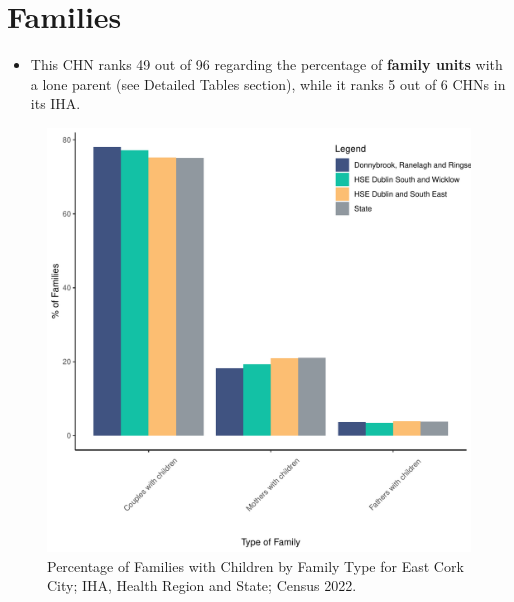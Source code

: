 \documentclass{article}
\begin{document}
\section{Families}\label{sect:Fam}
\begin{itemize}
\item This CHN ranks  49 out of 96 regarding the percentage of \textbf{family units} with a lone parent (see Detailed Tables section), while it ranks   5 out of 6 CHNs in its IHA.
\end{itemize}
\begin{figure}[H]
	\centering
	\includegraphics[width = 150mm]{../figures/FamED.pdf}
	\caption{Percentage of Families with Children by Family Type for East Cork City; IHA, Health Region and State; Census 2022.}
	\label{fig:vbnv}
	\end{figure}
	
\end{document}
